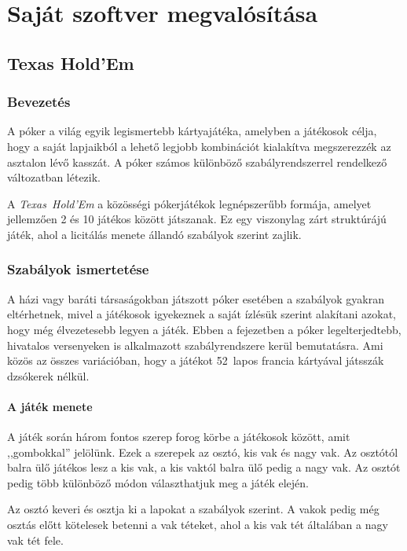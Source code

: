 \documentclass[]{thesis-ekf}
\theoremstyle{definition}
\theoremstyle{remark}
\begin{document}
\chapter{Saját szoftver megvalósítása}

\section{Texas Hold'Em}

\subsection{Bevezetés}

A póker a világ egyik legismertebb kártyajátéka, amelyben a játékosok célja, hogy a saját lapjaikból a lehető legjobb kombinációt kialakítva megszerezzék az asztalon lévő kasszát. A póker számos különböző szabályrendszerrel rendelkező változatban létezik.

A \emph{Texas~Hold’Em} a közösségi pókerjátékok legnépszerűbb formája, amelyet jellemzően 2 és 10 játékos között játszanak. Ez egy viszonylag zárt struktúrájú játék, ahol a licitálás menete állandó szabályok szerint zajlik.

\subsection{Szabályok ismertetése}

A házi vagy baráti társaságokban játszott póker esetében a szabályok gyakran eltérhetnek, mivel a játékosok igyekeznek a saját ízlésük szerint alakítani azokat, hogy még élvezetesebb legyen a játék. Ebben a fejezetben a póker legelterjedtebb, hivatalos versenyeken is alkalmazott szabályrendszere kerül bemutatásra. Ami közös az összes variációban, hogy a játékot 52~lapos francia kártyával játsszák dzsókerek nélkül.

\subsubsection{A játék menete \cite{WikipediaTexasholdem}}

A játék során három fontos szerep forog körbe a játékosok között, amit ,,gombokkal'' jelölünk. Ezek a szerepek az osztó, kis vak és nagy vak. Az osztótól balra ülő játékos lesz a kis vak, a kis vaktól balra ülő pedig a nagy vak. Az osztót pedig több különböző módon választhatjuk meg a játék elején.  

Az osztó keveri és osztja ki a lapokat a szabályok szerint. A vakok pedig még osztás előtt kötelesek betenni a vak téteket, ahol a kis vak tét általában a nagy vak tét fele.
\end{document}
